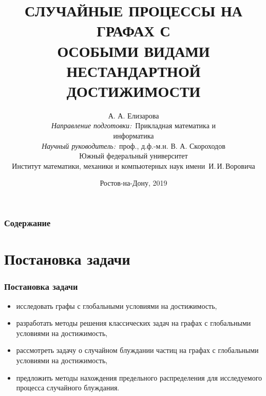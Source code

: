 \documentclass{beamer}
\title{\small{СЛУЧАЙНЫЕ ПРОЦЕССЫ НА ГРАФАХ С\\ОСОБЫМИ ВИДАМИ НЕСТАНДАРТНОЙ\\ДОСТИЖИМОСТИ}}
\author{\small{%
А. А. Елизарова\\%
\emph{Направление подготовки:}~Прикладная математика и\\информатика\\%
\emph{Научный руководитель:}~проф., д.ф.-м.н. В. А. Скороходов}\\%
\vspace{15pt}%
    Южный федеральный университет\\
    Институт математики, механики и компьютерных наук
    имени~И.\,И.\,Воровича%
}
\date{\small{Ростов-на-Дону, 2019}}
\begin{document}
	\begin{frame}
		\titlepage %
	\end{frame}

	\begin{frame}
		\frametitle{Содержание} %
		\tableofcontents %
	\end{frame}


\section{Постановка задачи}

\begin{frame}
\frametitle{Постановка задачи}

	\begin{itemize}
		\item исследовать графы с глобальными условиями на достижимость,
		\item разработать методы решения классических задач на графах с
		глобальными условиями на достижимость,
		\item рассмотреть задачу о случайном блуждании частиц на графах с глобальными условиями на достижимость,
		\item предложить методы нахождения предельного распределения для
		исследуемого процесса случайного блуждания.
	\end{itemize}

\end{frame}
\end{document}
